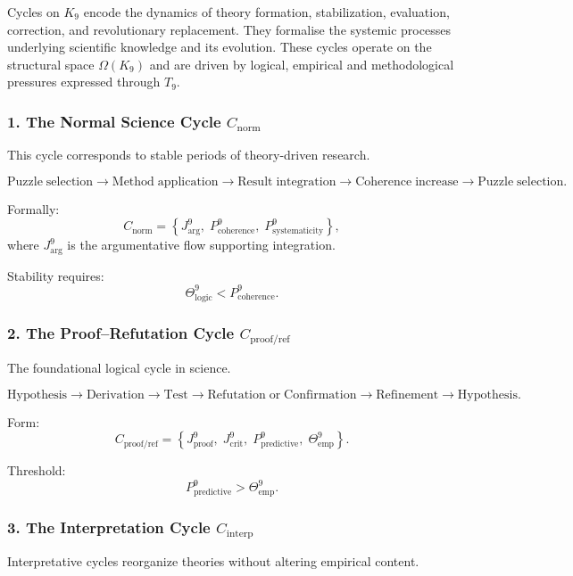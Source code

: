 Cycles on $K_9$ encode the dynamics of theory formation, stabilization,
evaluation, correction, and revolutionary replacement. They formalise
the systemic processes underlying scientific knowledge and its evolution.
These cycles operate on the structural space $\Omega(K_9)$ and are driven
by logical, empirical and methodological pressures expressed through $T_9$.


\subsubsection{1. The Normal Science Cycle $C_{\mathrm{norm}}$}

This cycle corresponds to stable periods of theory-driven research.

\[
  \mathrm{Puzzle\;selection}
  \to
  \mathrm{Method\;application}
  \to
  \mathrm{Result\;integration}
  \to
  \mathrm{Coherence\;increase}
  \to
  \mathrm{Puzzle\;selection}.
\]

Formally:
\[
 C_{\mathrm{norm}}
 =
 \left\{
   J^9_{\mathrm{arg}},\;
   P^9_{\mathrm{coherence}},\;
   P^9_{\mathrm{systematicity}}
 \right\},
\]
where $J^9_{\mathrm{arg}}$ is the argumentative flow supporting integration.

Stability requires:
\[
  \Theta^9_\mathrm{logic} < P^9_{\mathrm{coherence}}.
\]


\subsubsection{2. The Proof–Refutation Cycle $C_{\mathrm{proof/ref}}$}

The foundational logical cycle in science.

\[
  \mathrm{Hypothesis}
  \to
  \mathrm{Derivation}
  \to
  \mathrm{Test}
  \to
  \mathrm{Refutation\;or\;Confirmation}
  \to
  \mathrm{Refinement}
  \to
  \mathrm{Hypothesis}.
\]

Form:
\[
 C_{\mathrm{proof/ref}}
  =
  \left\{
    J^9_{\mathrm{proof}},\;
    J^9_{\mathrm{crit}},\;
    P^9_{\mathrm{predictive}},\;
    \Theta^9_{\mathrm{emp}}
  \right\}.
\]

Threshold:
\[
  P^9_{\mathrm{predictive}} > \Theta^9_\mathrm{emp}.
\]


\subsubsection{3. The Interpretation Cycle $C_{\mathrm{interp}}$}

Interpretative cycles reorganize theories without altering empirical content.

